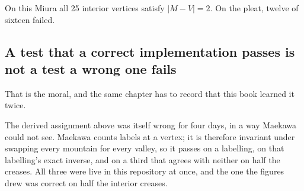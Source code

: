\documentclass[
  british,
  a4paper,
]{book}
\newenvironment{Shaded}{\begin{snugshade}}{\end{snugshade}}
\newcommand{\ControlFlowTok}[1]{\textcolor[rgb]{0.13,0.29,0.53}{\textbf{#1}}}
\newcommand{\DecValTok}[1]{\textcolor[rgb]{0.00,0.00,0.81}{#1}}
\newcommand{\FunctionTok}[1]{\textcolor[rgb]{0.13,0.29,0.53}{\textbf{#1}}}
\newcommand{\NormalTok}[1]{#1}
\newcommand{\OtherTok}[1]{\textcolor[rgb]{0.56,0.35,0.01}{#1}}
\newcommand{\SpecialCharTok}[1]{\textcolor[rgb]{0.81,0.36,0.00}{\textbf{#1}}}
\newcommand{\StringTok}[1]{\textcolor[rgb]{0.31,0.60,0.02}{#1}}
\begin{document}
\begin{Shaded}
\end{Shaded}

On this Miura all 25 interior vertices satisfy
\(\lvert M - V \rvert = 2\). On the pleat, twelve of sixteen
failed.

\subsection{A test that a correct implementation passes is not a test a wrong one fails}\label{a-test-that-a-correct-implementation-passes-is-not-a-test-a-wrong-one-fails}

That is the moral, and the same chapter has to record that this book learned it
twice.

The derived assignment above was itself wrong for four days, in a way Maekawa
could not see. Maekawa counts labels at a vertex; it is therefore invariant
under swapping every mountain for every valley, so it passes on a labelling, on
that labelling's exact inverse, and on a third that agrees with neither on half
the creases. All three were live in this repository at once, and the one the
figures drew was correct on half the interior creases.
\end{document}
